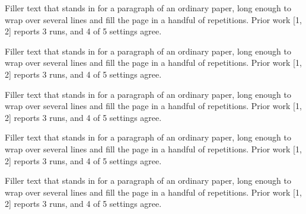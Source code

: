 \documentclass{article}
\begin{document}
Filler text that stands in for a paragraph of an ordinary paper, long enough to wrap over several lines and fill the page in a handful of repetitions. Prior work [1, 2] reports 3 runs, and 4 of 5 settings agree.\par
Filler text that stands in for a paragraph of an ordinary paper, long enough to wrap over several lines and fill the page in a handful of repetitions. Prior work [1, 2] reports 3 runs, and 4 of 5 settings agree.\par
Filler text that stands in for a paragraph of an ordinary paper, long enough to wrap over several lines and fill the page in a handful of repetitions. Prior work [1, 2] reports 3 runs, and 4 of 5 settings agree.\par
Filler text that stands in for a paragraph of an ordinary paper, long enough to wrap over several lines and fill the page in a handful of repetitions. Prior work [1, 2] reports 3 runs, and 4 of 5 settings agree.\par
Filler text that stands in for a paragraph of an ordinary paper, long enough to wrap over several lines and fill the page in a handful of repetitions. Prior work [1, 2] reports 3 runs, and 4 of 5 settings agree.\par
\end{document}

